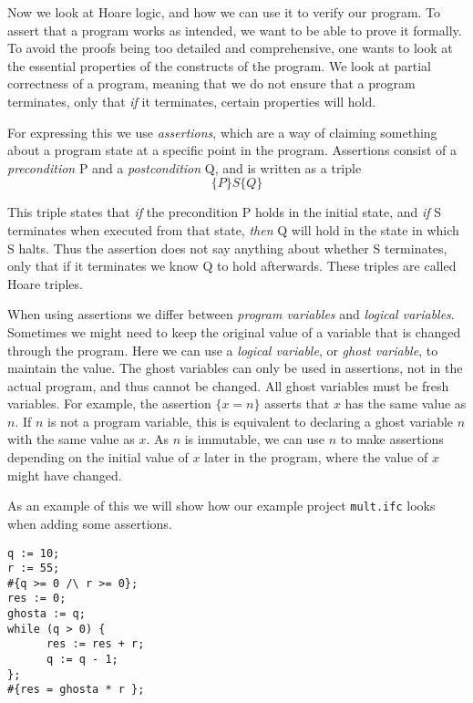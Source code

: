 Now we look at Hoare logic, and how we can use it to verify our program.
To assert that a program works as intended, we want to be able to prove it formally. To avoid the proofs being too detailed and comprehensive, one wants to look at the essential properties of the constructs of the program. We look at partial correctness of a program, meaning that we do not ensure that a program terminates, only that \textit{if} it terminates, certain properties will hold.

For expressing this we use \textit{assertions}, which are a way of claiming something about a program state at a specific point in the program.
Assertions consist of a \textit{precondition} P and a \textit{postcondition} Q, and is written as a triple
$$ \{ P \} S \{ Q \} $$

This triple states that \textit{if} the precondition P holds in the initial state, and \textit{if} S terminates when executed from that state, \textit{then} Q will hold in the state in which S halts.
Thus the assertion does not say anything about whether S terminates, only that if it terminates we know Q to hold afterwards. These triples are called Hoare triples.

When using assertions we differ between \textit{program variables} and \textit{logical variables}.
Sometimes we might need to keep the original value of a variable that is changed through the program. Here we can use a \textit{logical variable}, or \textit{ghost variable}, to maintain the value. The ghost variables can only be used in assertions, not in the actual program, and thus cannot be changed. All ghost variables must be fresh variables. 
For example, the assertion $\{x = n\}$ asserts that $x$ has the same value as $n$. If $n$ is not a program variable, this is equivalent to declaring a ghost variable $n$ with the same value as $x$. As $n$ is immutable, we can use $n$ to make assertions depending on the initial value of $x$ later in the program, where the value of $x$ might have changed.

As an example of this we will show how our example project \texttt{mult.ifc} looks when adding some assertions.
\begin{lstlisting}
q := 10;
r := 55;
#{q >= 0 /\ r >= 0};
res := 0;
ghosta := q;
while (q > 0) {
      res := res + r;
      q := q - 1;
};
#{res = ghosta * r };
\end{lstlisting}


